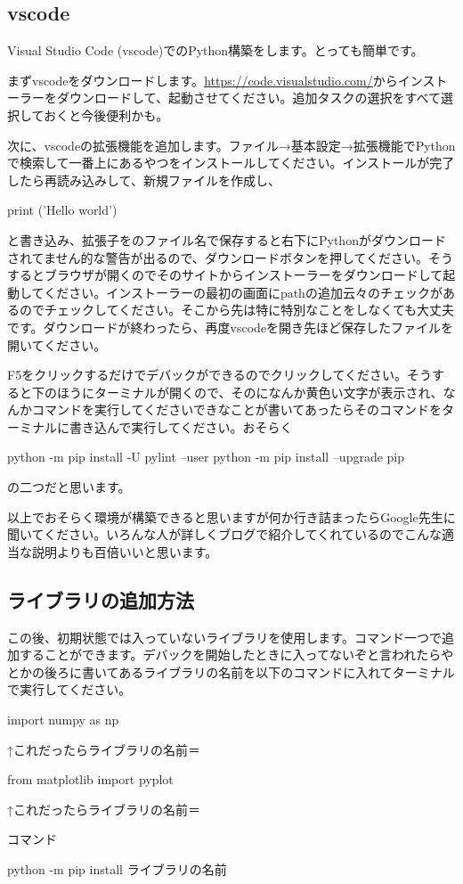 \documentclass[11pt,b5paper,papersize,dvipdfmx]{jsbook}
\begin{document}
\subsection{vscode}
Visual Studio Code (vscode)でのPython構築をします。とっても簡単です。\par
まずvscodeをダウンロードします。\url{https://code.visualstudio.com/}からインストーラーをダウンロードして、起動させてください。追加タスクの選択をすべて選択しておくと今後便利かも。\par
次に、vscodeの拡張機能を追加します。ファイル→基本設定→拡張機能でPythonで検索して一番上にあるやつをインストールしてください。インストールが完了したら再読み込みして、新規ファイルを作成し、
\begin{kdncode-i}
    print ('Hello world')
\end{kdncode-i}
と書き込み、拡張子をのファイル名で保存すると右下にPythonがダウンロードされてません的な警告が出るので、ダウンロードボタンを押してください。そうするとブラウザが開くのでそのサイトからインストーラーをダウンロードして起動してください。インストーラーの最初の画面にpathの追加云々のチェックがあるのでチェックしてください。そこから先は特に特別なことをしなくても大丈夫です。ダウンロードが終わったら、再度vscodeを開き先ほど保存したファイルを開いてください。\par
F5をクリックするだけでデバックができるのでクリックしてください。そうすると下のほうにターミナルが開くので、そのになんか黄色い文字が表示され、なんかコマンドを実行してくださいできなことが書いてあったらそのコマンドをターミナルに書き込んで実行してください。おそらく
\begin{kdncode-ii}
    python -m pip install -U pylint --user
    python -m pip install --upgrade pip
\end{kdncode-ii}
の二つだと思います。\par
以上でおそらく環境が構築できると思いますが何か行き詰まったらGoogle先生に聞いてください。いろんな人が詳しくブログで紹介してくれているのでこんな適当な説明よりも百倍いいと思います。

%
\subsection{ライブラリの追加方法}
この後、初期状態では入っていないライブラリを使用します。コマンド一つで追加することができます。デバックを開始したときに入ってないぞと言われたらやとかの後ろに書いてあるライブラリの名前を以下のコマンドに入れてターミナルで実行してください。
\begin{kdncode-ii}
    import numpy as np
\end{kdncode-ii}
↑これだったらライブラリの名前＝
\begin{kdncode-ii}
    from matplotlib import pyplot
\end{kdncode-ii}
↑これだったらライブラリの名前＝ \par
コマンド
\begin{kdncode-ii}
    python -m pip install ライブラリの名前
\end{kdncode-ii}
\end{document}
